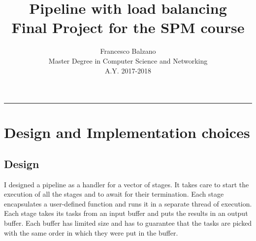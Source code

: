 \documentclass[12pt]{article}
\title{ \textbf {\vspace{0.1cm}\Huge Pipeline with load balancing\\ \vspace{0.3cm}}
 Final Project for the SPM course \vspace{0.5cm}\\}
\date{\vspace{1.0cm}}
\author{ \Large Francesco Balzano \vspace{0.3cm}\\ 
\Large Master Degree in Computer Science and Networking \vspace{0.4cm} \\
\Large A.Y. 2017-2018 
}
\begin{document}
  \maketitle
  \noindent\rule{18cm}{0.4pt}
  \tableofcontents
  \newpage

\clearpage
\setcounter{page}{2}
  
\section{Design and Implementation choices}

\subsection{Design} 
I designed a pipeline as a handler for a vector of stages. It takes care to start the execution of all the stages and to await for their termination. Each stage encapsulates a user-defined function and runs it in a separate thread of execution. Each stage takes its tasks from an input buffer and puts the results in an output buffer. Each buffer has limited size and has to guarantee that the tasks are picked with the same order in which they were put in the buffer.
\end{document}

